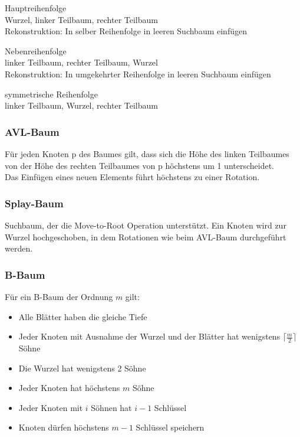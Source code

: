 \documentclass[11pt]{article}
\begin{document}
\begin{description}[labelindent=16pt,style=multiline,leftmargin=3cm, noitemsep]
	\item[preorder:] Hauptreihenfolge \\
					 Wurzel, linker Teilbaum, rechter Teilbaum	\\
					 Rekonstruktion: In selber Reihenfolge in leeren Suchbaum einfügen
	\item[postorder:] Nebenreihenfolge \\
					  linker Teilbaum, rechter Teilbaum, Wurzel \\
					  Rekonstruktion: In umgekehrter Reihenfolge in leeren Suchbaum einfügen
	\item[inorder:] symmetrische Reihenfolge \\
					linker Teilbaum, Wurzel, rechter Teilbaum
\end{description}

\subsubsection{AVL-Baum}

Für jeden Knoten p des Baumes gilt, dass sich die Höhe des linken Teilbaumes von der Höhe des rechten Teilbaumes von p höchstens um 1 unterscheidet. \\

Das Einfügen eines neuen Elements führt höchstens zu einer Rotation.

\subsubsection{Splay-Baum}

Suchbaum, der die Move-to-Root Operation unterstützt. Ein Knoten wird zur Wurzel hochgeschoben, in dem Rotationen wie beim AVL-Baum durchgeführt werden.

\subsubsection{B-Baum}

Für ein B-Baum der Ordnung $m$ gilt:

\begin{itemize}[noitemsep]
	\item Alle Blätter haben die gleiche Tiefe
	\item Jeder Knoten mit Ausnahme der Wurzel und der Blätter hat wenigstens $\lceil \frac{m}{2} \rceil$ Söhne
	\item Die Wurzel hat wenigstens 2 Söhne
	\item Jeder Knoten hat höchstens $m$ Söhne
	\item Jeder Knoten mit $i$ Söhnen hat $i-1$ Schlüssel
	\item Knoten dürfen höchstens $m-1$ Schlüssel speichern
\end{itemize}
\end{document}
